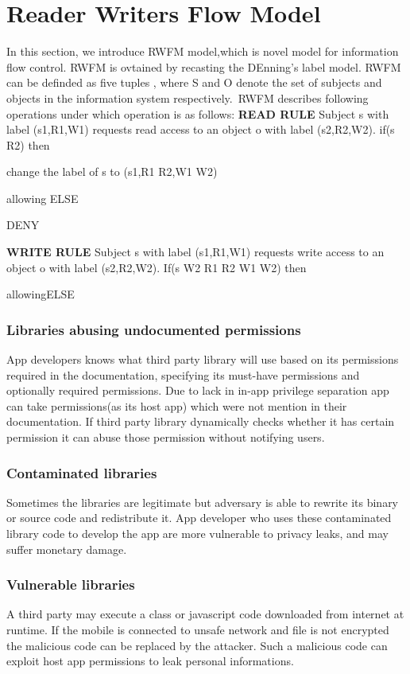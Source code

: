 \documentclass[11pt]{report}
\begin{document}
\chapter{Reader Writers Flow Model} 
In this section, we introduce RWFM model,which is  novel model  for information flow control. RWFM is ovtained by recasting the DEnning's label model. RWFM can be definded as five tuples
                          , where S and O denote the set of subjects and objects in the information system respectively.\
RWFM describes following operations under which operation is as follows:
\textbf{READ RULE}
Subject s with label (s1,R1,W1) requests read access to an object o with label (s2,R2,W2).
if(s R2) then 
\par change the label of s to (s1,R1 R2,W1 W2)
\par allowing
ELSE 
\par DENY

\textbf{WRITE RULE}
Subject s with label (s1,R1,W1) requests write access to an object o with label (s2,R2,W2).
If(s W2 R1 R2 W1 W2) then 
\par allowingELSE 
\
\subsection{Libraries abusing undocumented permissions}
\par App developers knows what third party library will use based on its permissions required in the documentation, specifying its must-have permissions and optionally required 
permissions. Due to lack in in-app privilege separation app can take permissions(as its host app) which were not mention in their documentation. If third party library dynamically
checks whether it has certain permission it can abuse those permission without notifying users.
\subsection{Contaminated libraries}
\par Sometimes the libraries are legitimate but adversary is able to rewrite its binary or source code and redistribute it. App developer who uses these contaminated library code 
to develop the app are more vulnerable to privacy leaks, and may suffer monetary damage.
\subsection{Vulnerable libraries}
\par A third party may execute a class or javascript code downloaded from internet at runtime. If the mobile is connected to unsafe network and file is not encrypted the malicious
code can be replaced by the attacker. Such a malicious code can exploit host app permissions to leak personal informations.
\end{document}
